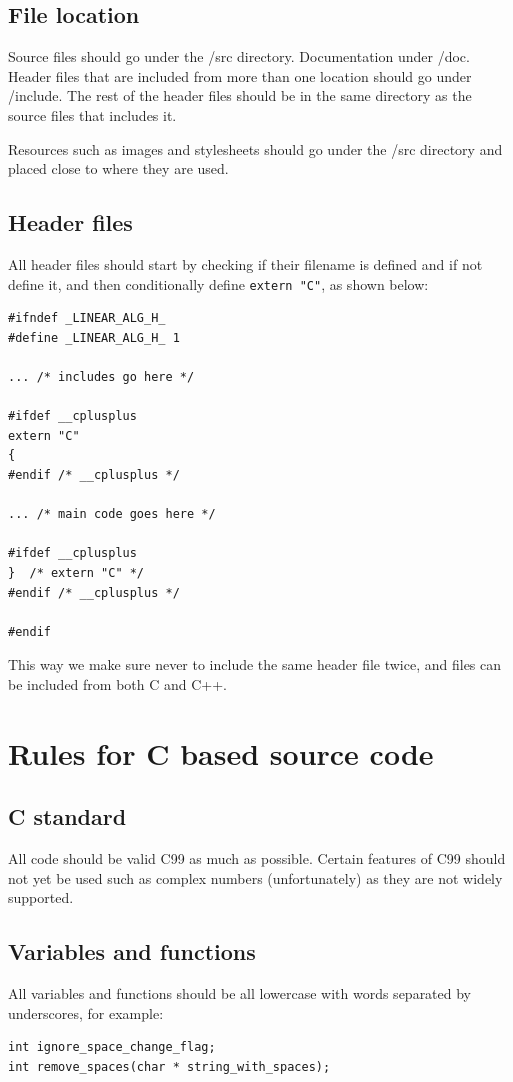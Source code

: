 \documentclass[12pt]{article}
\newenvironment{sourcestyle}{}{}%
\begin{document}
\subsection{File location}
Source files should go under the /src directory. Documentation under /doc. 
Header files that are included from more than one location should go under /include. 
The rest of the header files should be in the same directory as the source files that includes it.

Resources such as images and stylesheets should go under the /src directory and placed close to where they are used.

\subsection{Header files}
All header files should start by checking if their filename is defined
and if not define it, and then conditionally define {\tt extern "C"},  as shown below:
\begin{sourcestyle}
\begin{verbatim}
#ifndef _LINEAR_ALG_H_
#define _LINEAR_ALG_H_ 1

... /* includes go here */

#ifdef __cplusplus
extern "C"
{
#endif /* __cplusplus */

... /* main code goes here */

#ifdef __cplusplus
}  /* extern "C" */
#endif /* __cplusplus */

#endif
\end{verbatim}
\end{sourcestyle}
This way we make sure never to include the same header file twice, and files can be included
from both C and C++.

\section{Rules for C based source code}
\subsection{C standard}
All code should be valid C99 as much as possible. Certain features of C99 should not yet 
be used such as complex numbers (unfortunately) as they are not widely supported.

\subsection{Variables and functions}
All variables and functions should be all lowercase with words separated by underscores, 
for example:
\begin{sourcestyle}
\begin{verbatim}
int ignore_space_change_flag;
int remove_spaces(char * string_with_spaces);
\end{verbatim}
\end{sourcestyle}
\end{document}
